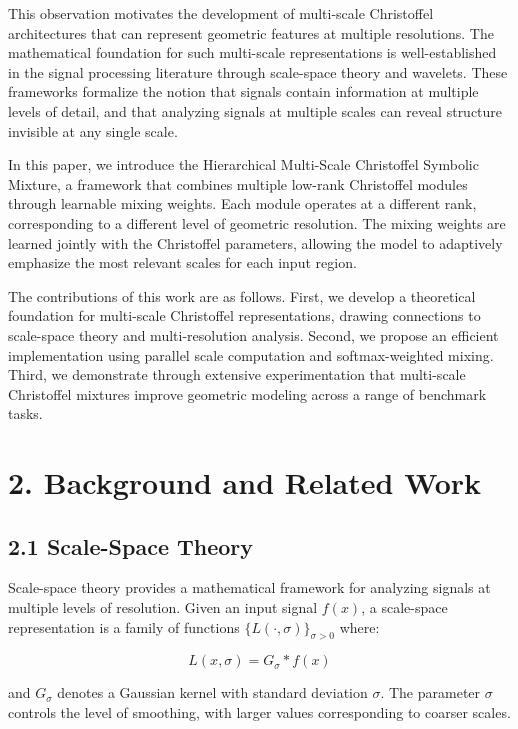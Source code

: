 \documentclass[12pt]{article}
\begin{document}
This observation motivates the development of multi-scale Christoffel architectures that can represent geometric features at multiple resolutions. The mathematical foundation for such multi-scale representations is well-established in the signal processing literature through scale-space theory and wavelets. These frameworks formalize the notion that signals contain information at multiple levels of detail, and that analyzing signals at multiple scales can reveal structure invisible at any single scale.

In this paper, we introduce the Hierarchical Multi-Scale Christoffel Symbolic Mixture, a framework that combines multiple low-rank Christoffel modules through learnable mixing weights. Each module operates at a different rank, corresponding to a different level of geometric resolution. The mixing weights are learned jointly with the Christoffel parameters, allowing the model to adaptively emphasize the most relevant scales for each input region.

The contributions of this work are as follows. First, we develop a theoretical foundation for multi-scale Christoffel representations, drawing connections to scale-space theory and multi-resolution analysis. Second, we propose an efficient implementation using parallel scale computation and softmax-weighted mixing. Third, we demonstrate through extensive experimentation that multi-scale Christoffel mixtures improve geometric modeling across a range of benchmark tasks.

\section{2. Background and Related Work}

\subsection{2.1 Scale-Space Theory}

Scale-space theory provides a mathematical framework for analyzing signals at multiple levels of resolution. Given an input signal $f(x)$, a scale-space representation is a family of functions $\{L(\cdot, \sigma)\}_{\sigma > 0}$ where:

\begin{equation}
L(x, \sigma) = G_\sigma * f(x)
\end{equation}

and $G_\sigma$ denotes a Gaussian kernel with standard deviation $\sigma$. The parameter $\sigma$ controls the level of smoothing, with larger values corresponding to coarser scales.
\end{document}
